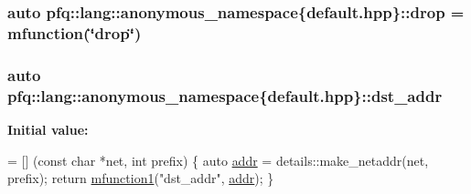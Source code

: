 \hypertarget{namespacepfq_1_1lang_1_1anonymous__namespace_02default_8hpp_03_a0d715988e000ac6284a1615091eb4067}{
\subsubsection[{drop}]{\setlength{\rightskip}{0pt plus 5cm}auto pfq\+::lang\+::anonymous\+\_\+namespace\{default.\+hpp\}\+::drop = {\bf mfunction}(\char`\"{}drop\char`\"{})}}\label{namespacepfq_1_1lang_1_1anonymous__namespace_02default_8hpp_03_a0d715988e000ac6284a1615091eb4067}
\hypertarget{namespacepfq_1_1lang_1_1anonymous__namespace_02default_8hpp_03_a3f51de44baa33ff19a94995945636072}{
\subsubsection[{dst\+\_\+addr}]{\setlength{\rightskip}{0pt plus 5cm}auto pfq\+::lang\+::anonymous\+\_\+namespace\{default.\+hpp\}\+::dst\+\_\+addr}}\label{namespacepfq_1_1lang_1_1anonymous__namespace_02default_8hpp_03_a3f51de44baa33ff19a94995945636072}
{\bfseries Initial value\+:}
\begin{DoxyCode}
= [] (\textcolor{keyword}{const} \textcolor{keywordtype}{char} *net, \textcolor{keywordtype}{int} prefix)
        \{
            \textcolor{keyword}{auto} \hyperlink{namespacepfq_1_1lang_1_1anonymous__namespace_02default_8hpp_03_a13cabe468839119d8d68540e3c60718b}{addr} = details::make\_netaddr(net, prefix);
            \textcolor{keywordflow}{return} \hyperlink{namespacepfq_1_1lang_a68d775c68562fbd0ab9ef213f2519499}{mfunction1}(\textcolor{stringliteral}{"dst\_addr"}, \hyperlink{namespacepfq_1_1lang_1_1anonymous__namespace_02default_8hpp_03_a13cabe468839119d8d68540e3c60718b}{addr});
        \}
\end{DoxyCode}
